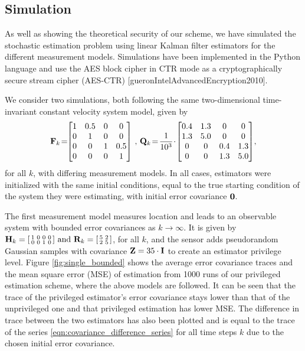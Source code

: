 \subsection{Simulation}\label{subsec:priv_estimation:est_simulation}
As well as showing the theoretical security of our scheme, we have simulated the stochastic estimation problem using linear Kalman filter estimators for the different measurement models. Simulations have been implemented in the Python language and use the AES block cipher in CTR mode as a cryptographically secure stream cipher (AES-CTR) [gueronIntelAdvancedEncryption2010].

We consider two simulations, both following the same two-dimensional time-invariant constant velocity system model, given by
\begin{equation*}
   \mat{F}_k\! = \!\!
   \begin{bmatrix}
      1 & 0.5 & 0 & 0\\
      0 & 1 & 0 & 0\\
      0 & 0 & 1 & 0.5\\
      0 & 0 & 0 & 1
   \end{bmatrix}\,,\,
   \mat{Q}_k\! = \!\frac{1}{10^3}\!\cdot\!
   \begin{bmatrix}
      0.4 & 1.3 & 0 & 0\\
      1.3 & 5.0 & 0 & 0\\
      0 & 0 & 0.4 & 1.3\\
      0 & 0 & 1.3 & 5.0
   \end{bmatrix}\!,
\end{equation*}
for all $k$, with differing measurement models. In all cases, estimators were initialized with the same initial conditions, equal to the true starting condition of the system they were estimating, with initial error covariance ${{\mathbf{0}}}$.

The first measurement model measures location and leads to an observable system with bounded error covariances as $k \rightarrow \infty$. It is given by 
$
   {{\mathbf{H}}}_k=
   \begin{bsmallmatrix}
      1 & 0 & 0 & 0\\
      0 & 0 & 1 & 0
   \end{bsmallmatrix}
   \text{ and }
   {\ensuremath{{\mathbf{R}}}}_k=
   \begin{bsmallmatrix}
      5 & 2\\
      2 & 5
   \end{bsmallmatrix}
$, 
for all $k$, and the sensor adds pseudorandom Gaussian samples with covariance ${{\mathbf{Z}}}=35 \cdot {\ensuremath{{\mathbf{I}}}}$ to create an estimator privilege level. Figure \ref{fig:single_bounded} shows the average error covariance traces and the mean square error (MSE) of estimation from 1000 runs of our privileged estimation scheme, where the above models are followed. It can be seen that the trace of the privileged estimator's error covariance stays lower than that of the unprivileged one and that privileged estimation has lower MSE. The difference in trace between the two estimators has also been plotted and is equal to the trace of the series \eqref{eqn:covariance_difference_series} for all time steps $k$ due to the chosen initial error covariance.

